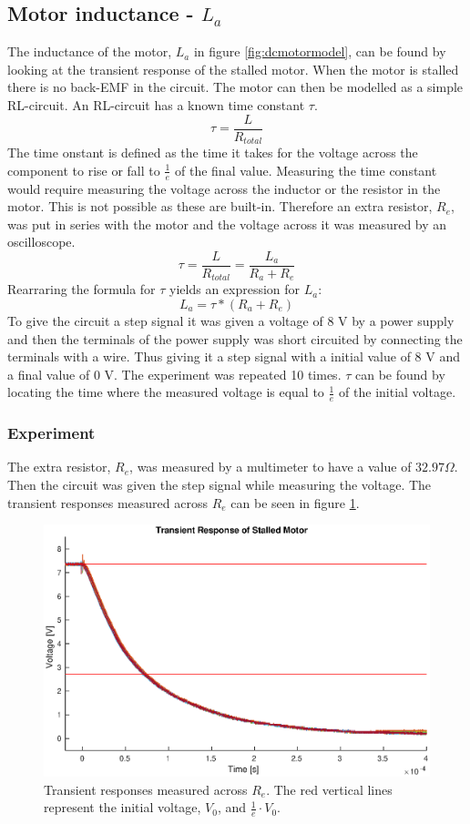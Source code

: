 \subsection{Motor inductance - $L_a$}
The inductance of the motor, $L_a$ in figure \ref{fig:dcmotormodel}, can be found by looking at the transient response of the stalled motor. 
When the motor is stalled there is no back-EMF in the circuit. The motor can then be modelled as a simple RL-circuit. 
An RL-circuit has a known time constant $\tau$.
$$\tau = \frac{L}{R_{total}}$$
The time onstant is defined as the time it takes for the voltage across the component to rise or fall to $\frac{1}{e}$ of the final value.
Measuring the time constant would require measuring the voltage across the inductor or the resistor in the motor. This is not possible as these are built-in. 
Therefore an extra resistor, $R_e$, was put in series with the motor and the voltage across it was measured by an oscilloscope. 
$$\tau = \frac{L}{R_{total}} = \frac{L_a}{R_a+R_e}$$
Rearraring the formula for $\tau$ yields an expression for $L_a$: 
$$L_a = \tau * (R_a + R_e)$$
To give the circuit a step signal it was given a voltage of 8 V by a power supply and then the terminals of the power supply was  short circuited by connecting the terminals with a wire. Thus giving it a step signal with a initial value of 8 V and a final value of 0 V.
The experiment was repeated 10 times. $\tau$ can be found by locating the time where the measured voltage is equal to $\frac{1}{e}$ of the initial voltage.

\subsubsection{Experiment}
The extra resistor, $R_e$, was measured by a multimeter to have a value of $32.97\Omega$.
Then the circuit was given the step signal while measuring the voltage.
The transient responses measured across $R_e$ can be seen in figure \ref{fig:trans_plot}.

\begin{figure}[!h]
	\centering
	\includegraphics[width=.75\linewidth]{graphics/transient_32ohm}
	\caption{Transient responses measured across $R_e$. The red vertical lines represent the initial voltage, $V_0$, and $\frac{1}{e} \cdot V_0$.}
	\label{fig:trans_plot}
\end{figure}


